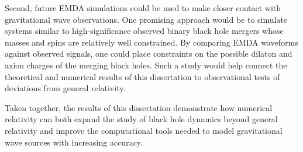 Second, future EMDA simulations could be used to make closer contact with gravitational wave observations. One promising approach would be to simulate systems similar to high-significance observed binary black hole mergers whose masses and spins are relatively well constrained. By comparing EMDA waveforms against observed signals, one could place constraints on the possible dilaton and axion charges of the merging black holes. Such a study would help connect the theoretical and numerical results of this dissertation to observational tests of deviations from general relativity.

Taken together, the results of this dissertation demonstrate how numerical relativity can both expand the study of black hole dynamics beyond general relativity and improve the computational tools needed to model gravitational wave sources with increasing accuracy.






